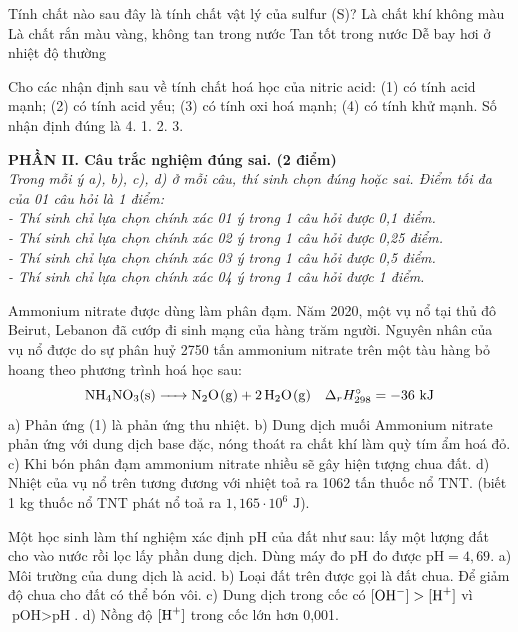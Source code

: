 \documentclass[12pt,a4paper]{article}
\begin{document}
\begin{ex}
Tính chất nào sau đây là tính chất vật lý của sulfur (S)?
\choice
{Là chất khí không màu}
{Là chất rắn màu vàng, không tan trong nước}
{Tan tốt trong nước}
{Dễ bay hơi ở nhiệt độ thường}
\loigiai{}
\end{ex}

\begin{ex}
Cho các nhận định sau về tính chất hoá học của nitric acid: (1) có tính acid mạnh; (2) có tính acid yếu; (3) có tính oxi hoá mạnh; (4) có tính khử mạnh. Số nhận định đúng là
\choice
{4.}
{1.}
{2.}
{3.}
\loigiai{}
\end{ex}


\bigskip
\noindent
\textbf{PHẦN II. Câu trắc nghiệm đúng sai. (2 điểm)}\\
\textit{Trong mỗi ý a), b), c), d) ở mỗi câu, thí sinh chọn đúng hoặc sai. Điểm tối đa của 01 câu hỏi là 1 điểm:}\\
\textit{- Thí sinh chỉ lựa chọn chính xác 01 ý trong 1 câu hỏi được 0,1 điểm.}\\
\textit{- Thí sinh chỉ lựa chọn chính xác 02 ý trong 1 câu hỏi được 0,25 điểm.}\\
\textit{- Thí sinh chỉ lựa chọn chính xác 03 ý trong 1 câu hỏi được 0,5 điểm.}\\
\textit{- Thí sinh chỉ lựa chọn chính xác 04 ý trong 1 câu hỏi được 1 điểm.}

\begin{ex}
Ammonium nitrate được dùng làm phân đạm. Năm 2020, một vụ nổ tại thủ đô Beirut, Lebanon đã cướp đi sinh mạng của hàng trăm người. Nguyên nhân của vụ nổ được do sự phân huỷ 2750 tấn ammonium nitrate trên một tàu hàng bỏ hoang theo phương trình hoá học sau:
\[ \ce{NH4NO3(s) -> N2O(g) + 2H2O(g)} \quad \Delta_r H_{298}^\circ = -36\text{ kJ} \]
\choiceTF
{a) Phản ứng (1) là phản ứng thu nhiệt.}
{b) Dung dịch muối Ammonium nitrate phản ứng với dung dịch base đặc, nóng thoát ra chất khí làm quỳ tím ẩm hoá đỏ.}
{c) Khi bón phân đạm ammonium nitrate nhiều sẽ gây hiện tượng chua đất.}
{d) Nhiệt của vụ nổ trên tương đương với nhiệt toả ra 1062 tấn thuốc nổ TNT. (biết 1 kg thuốc nổ TNT phát nổ toả ra $1{,}165 \cdot 10^6\text{ J}$).}
\loigiai{}
\end{ex}

\begin{ex}
Một học sinh làm thí nghiệm xác định pH của đất như sau: lấy một lượng đất cho vào nước rồi lọc lấy phần dung dịch. Dùng máy đo pH đo được $\text{pH} = 4{,}69$.
\choiceTF
{a) Môi trường của dung dịch là acid.}
{b) Loại đất trên được gọi là đất chua. Để giảm độ chua cho đất có thể bón vôi.}
{c) Dung dịch trong cốc có $[\ce{OH-}] > [\ce{H+}]$ vì $\text{pOH} > \text{pH}$.}
{d) Nồng độ $[\ce{H+}]$ trong cốc lớn hơn 0,001.}
\loigiai{}
\end{ex}
\end{document}
